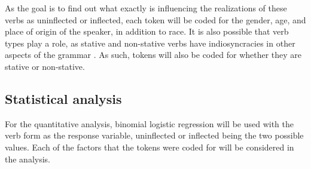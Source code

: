 \documentclass{article}
\begin{document}
      As the goal is to find out what exactly is influencing the realizations of these verbs as uninflected or inflected, each token will be coded for the gender, age, and place of origin of the speaker, in addition to race.
      It is also possible that verb types play a role, as stative and non-stative verbs have indiosyncracies in other aspects of the grammar \parencite[pp.~252-253]{klingler_if_2003}.
      As such, tokens will also be coded for whether they are stative or non-stative.

    \subsection{Statistical analysis}
      For the quantitative analysis, binomial logistic regression will be used with the verb form as the response variable, uninflected or inflected being the two possible values.
      Each of the factors that the tokens were coded for will be considered in the analysis.
    \printbibliography
\end{document}
